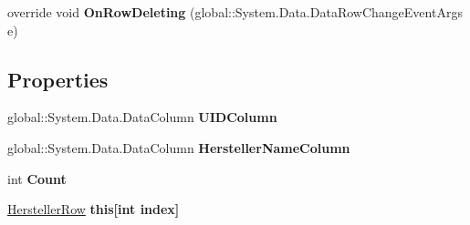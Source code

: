 \begin{DoxyCompactItemize}
\item 
override void {\bfseries On\+Row\+Deleting} (global\+::\+System.\+Data.\+Data\+Row\+Change\+Event\+Args e)\hypertarget{class_products_1_1_data_1_1ds_sage_1_1_hersteller_data_table_a0bc49906a45414263a5208702e9010a2}{}\label{class_products_1_1_data_1_1ds_sage_1_1_hersteller_data_table_a0bc49906a45414263a5208702e9010a2}

\end{DoxyCompactItemize}
\subsection*{Properties}
\begin{DoxyCompactItemize}
\item 
global\+::\+System.\+Data.\+Data\+Column {\bfseries U\+I\+D\+Column}\hypertarget{class_products_1_1_data_1_1ds_sage_1_1_hersteller_data_table_a2293c6b57a75eb1f8221a4b73dcd7690}{}\label{class_products_1_1_data_1_1ds_sage_1_1_hersteller_data_table_a2293c6b57a75eb1f8221a4b73dcd7690}

\item 
global\+::\+System.\+Data.\+Data\+Column {\bfseries Hersteller\+Name\+Column}\hypertarget{class_products_1_1_data_1_1ds_sage_1_1_hersteller_data_table_ac5651322f6b12f4f5a63486e31c4fe40}{}\label{class_products_1_1_data_1_1ds_sage_1_1_hersteller_data_table_ac5651322f6b12f4f5a63486e31c4fe40}

\item 
int {\bfseries Count}\hypertarget{class_products_1_1_data_1_1ds_sage_1_1_hersteller_data_table_ae7cfa461f5f9225a9033335758ed72ed}{}\label{class_products_1_1_data_1_1ds_sage_1_1_hersteller_data_table_ae7cfa461f5f9225a9033335758ed72ed}

\item 
\hyperlink{class_products_1_1_data_1_1ds_sage_1_1_hersteller_row}{Hersteller\+Row} {\bfseries this\mbox{[}int index\mbox{]}}\hypertarget{class_products_1_1_data_1_1ds_sage_1_1_hersteller_data_table_a7ca7c1d9b26888ebc24cc0e6413135c4}{}\label{class_products_1_1_data_1_1ds_sage_1_1_hersteller_data_table_a7ca7c1d9b26888ebc24cc0e6413135c4}

\end{DoxyCompactItemize}
